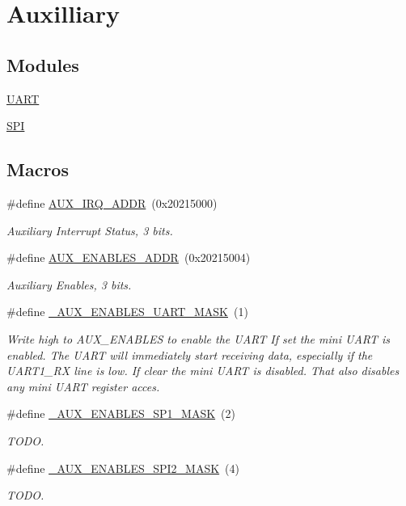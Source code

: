 \hypertarget{group__Auxilliary}{}\section{Auxilliary}
\label{group__Auxilliary}
\subsection*{Modules}
\begin{DoxyCompactItemize}
\item 
\hyperlink{group__UART}{U\+A\+RT}
\item 
\hyperlink{group__SPI}{S\+PI}
\end{DoxyCompactItemize}
\subsection*{Macros}
\begin{DoxyCompactItemize}
\item 
\#define \hyperlink{group__Auxilliary_ga639b2045d2c60d72ba8e023bcdcf32a1}{A\+U\+X\+\_\+\+I\+R\+Q\+\_\+\+A\+D\+DR}~(0x20215000)
\begin{DoxyCompactList}\small\item\em Auxiliary Interrupt Status, 3 bits. \end{DoxyCompactList}\item 
\#define \hyperlink{group__Auxilliary_gab0a21230d9d57f4131ce59a3c610593f}{A\+U\+X\+\_\+\+E\+N\+A\+B\+L\+E\+S\+\_\+\+A\+D\+DR}~(0x20215004)
\begin{DoxyCompactList}\small\item\em Auxiliary Enables, 3 bits. \end{DoxyCompactList}\item 
\#define \hyperlink{group__Auxilliary_gaa8e8d454e69ce6fa80fc26e805e21685}{\+\_\+\+A\+U\+X\+\_\+\+E\+N\+A\+B\+L\+E\+S\+\_\+\+U\+A\+R\+T\+\_\+\+M\+A\+SK}~(1)
\begin{DoxyCompactList}\small\item\em Write high to A\+U\+X\+\_\+\+E\+N\+A\+B\+L\+ES to enable the U\+A\+RT If set the mini U\+A\+RT is enabled. The U\+A\+RT will immediately start receiving data, especially if the U\+A\+R\+T1\+\_\+\+RX line is low. If clear the mini U\+A\+RT is disabled. That also disables any mini U\+A\+RT register acces. \end{DoxyCompactList}\item 
\#define \hyperlink{group__Auxilliary_gae192c6ccec73788912e4c86332809303}{\+\_\+\+A\+U\+X\+\_\+\+E\+N\+A\+B\+L\+E\+S\+\_\+\+S\+P1\+\_\+\+M\+A\+SK}~(2)
\begin{DoxyCompactList}\small\item\em T\+O\+DO. \end{DoxyCompactList}\item 
\#define \hyperlink{group__Auxilliary_ga65e995e623899837a9f8f117cfb06093}{\+\_\+\+A\+U\+X\+\_\+\+E\+N\+A\+B\+L\+E\+S\+\_\+\+S\+P\+I2\+\_\+\+M\+A\+SK}~(4)
\begin{DoxyCompactList}\small\item\em T\+O\+DO. \end{DoxyCompactList}\end{DoxyCompactItemize}


